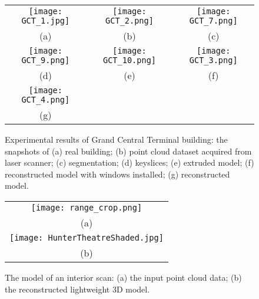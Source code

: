\begin{figure} [htbp]
\begin{center}
\begin{tabular}{ccc}
\texttt{[image: GCT\_1.jpg]} &
\texttt{[image: GCT\_2.png]} &
\texttt{[image: GCT\_7.png]} \\
(a) & (b) & (c)\\
\texttt{[image: GCT\_9.png]} &
\texttt{[image: GCT\_10.png]} &
\texttt{[image: GCT\_3.png]} \\
(d) & (e) & (f)\\
\texttt{[image: GCT\_4.png]} \\
(g)
\end{tabular}
\end{center}
\caption{ Experimental results of Grand Central Terminal building: the snapshots of
      (a) real building;
      (b) point cloud dataset acquired from laser scanner;
      (c) segmentation;
      (d) keyslices;
      (e) extruded model;
      (f) reconstructed model with windows installed;
      (g) reconstructed model.
}
\label{fig:GCT_Fig}
\end{figure}


\begin{figure*}[htbp]
\begin{center}
\begin{tabular}{c}
\texttt{[image: range\_crop.png]} \\
(a) \\
\texttt{[image: HunterTheatreShaded.jpg]} \\
(b)
\end{tabular}
\end{center}
\caption{The model of an interior scan: (a) the input point cloud data;
(b) the reconstructed lightweight 3D model.}
\label{fig:IN}
\end{figure*}

